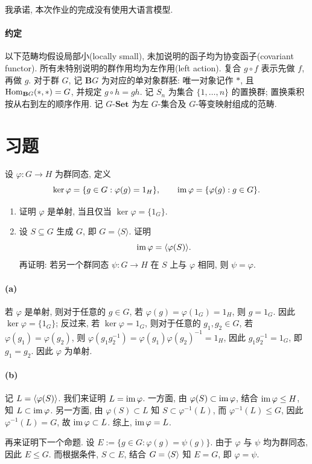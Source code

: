 \documentclass{article}
\begin{document}
{\heiti 我承诺, 本次作业的完成没有使用大语言模型.}

\paragraph{约定} 以下范畴均假设局部小(locally small), 未加说明的函子均为协变函子(covariant functor). 所有未特别说明的群作用均为左作用(left action). 复合 $g\circ f$ 表示先做 $f$, 再做 $g$. 对于群 $G$, 记 $\mathbf{B}G$ 为对应的单对象群胚: 唯一对象记作 $*$, 且 $\operatorname{Hom}_{\mathbf{B}G}(*,*)=G$, 并规定 $g\circ h=gh$. 记 $S_n$ 为集合 $\{1,\ldots,n\}$ 的置换群; 置换乘积按从右到左的顺序作用. 记 $G$-$\mathbf{Set}$ 为左 $G$-集合及 $G$-等变映射组成的范畴.

\section*{习题}

\begin{problem}
  设 $\varphi:G\to H$ 为群同态, 定义
  \[
    \ker\varphi=\{g\in G:\varphi(g)=1_H\},\qquad
    \operatorname{im}\varphi=\{\varphi(g):g\in G\}.
  \]
  \begin{enumerate}
    \item[(a)] 证明 $\varphi$ 是单射, 当且仅当 $\ker\varphi=\{1_G\}$.
    \item[(b)] 设 $S\subseteq G$ 生成 $G$, 即 $G=\langle S\rangle$. 证明
      \[
        \operatorname{im}\varphi=\langle\varphi(S)\rangle.
      \]
      再证明: 若另一个群同态 $\psi:G\to H$ 在 $S$ 上与 $\varphi$ 相同, 则 $\psi=\varphi$.
  \end{enumerate}
\end{problem}

\begin{solution}
	\paragraph{(a)} 若 $\varphi$ 是单射, 则对于任意的 $g \in G$, 若 $\varphi(g) = \varphi(1_G) = 1_H$, 则 $g = 1_G$. 因此 $\ker \varphi = \{1_G\}$; 反过来, 若 $\ker \varphi = 1_G$, 则对于任意的 $g_1, g_2 \in G$, 若 $\varphi(g_1) = \varphi(g_2)$, 则 $\varphi(g_1g_2^{-1}) = \varphi(g_1) \varphi(g_2)^{-1} = 1_H$, 因此 $g_1g_2^{-1} = 1_G$, 即 $g_1 = g_2$. 因此 $\varphi$ 为单射.

	\paragraph{(b)} 记 $L = \left\langle \varphi(S) \right\rangle$. 我们来证明 $L = \operatorname{im} \varphi$. 一方面, 由 $\varphi(S) \subset \operatorname{im} \varphi$, 结合 $\operatorname{im} \varphi \le H$, 知 $L \subset \operatorname{im} \varphi$. 另一方面, 由 $\varphi(S) \subset L$ 知 $S \subset \varphi^{-1}(L)$, 而 $\varphi^{-1}(L) \le G$, 因此 $\varphi^{-1}(L) = G$, 故 $\operatorname{im} \varphi \subset L$. 综上, $\operatorname{im} \varphi = L$. 

	再来证明下一个命题. 设 $E := \{g \in G: \varphi(g) = \psi(g)\}$. 由于 $\varphi$ 与 $\psi$ 均为群同态, 因此 $E\le G$. 而根据条件, $S \subset E$, 结合 $G = \left\langle S \right\rangle$ 知 $E=G$, 即 $\varphi = \psi$.
\end{solution}
\end{document}
